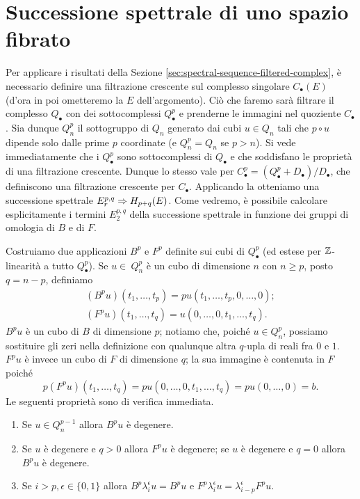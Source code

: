 \section{Successione spettrale di uno spazio fibrato}
Per applicare i risultati della Sezione \ref{sec:spectral-sequence-filtered-complex}, è necessario definire una filtrazione crescente sul complesso singolare $C_\bullet(E)$ (d'ora in poi ometteremo la $E$ dell'argomento). Ciò che faremo sarà filtrare il complesso $Q_\bullet$ con dei sottocomplessi $Q^p_\bullet$ e prenderne le immagini nel quoziente $C_\bullet$. Sia dunque $Q^p_n$ il sottogruppo di $Q_n$ generato dai cubi $u\in Q_n$ tali che $p\circ u$ dipende solo dalle prime $p$ coordinate (e $Q^p_n=Q_n$ se $p>n$). Si vede immediatamente che i $Q^p_\bullet$ sono sottocomplessi di $Q_\bullet$ e che soddisfano le proprietà di una filtrazione crescente. Dunque lo stesso vale per $C^p_\bullet=(Q^p_\bullet+D_\bullet)/D_\bullet$, che definiscono una filtrazione crescente per $C_\bullet$. Applicando la  otteniamo una successione spettrale $E^{p,q}_r\Rightarrow H_{p+q}(E)$. Come vedremo, è possibile calcolare esplicitamente i termini $E^{p,q}_2$ della successione spettrale in funzione dei gruppi di omologia di $B$ e di $F$.

Costruiamo due applicazioni $B^p$ e $F^p$ definite sui cubi di $Q^p_\bullet$ (ed estese per $\mathbb{Z}$-linearità a tutto $Q^p_\bullet$). Se $u\in\ Q^p_n$ è un cubo di dimensione $n$ con $n\ge p$, posto $q=n-p$, definiamo
\begin{align*}
(B^pu)(t_1,\ldots,t_p)=pu(t_1,\ldots,t_p,0,\ldots,0);\\
(F^pu)(t_1,\ldots,t_q)=u(0,\ldots,0,t_1,\ldots,t_q).
\end{align*}
$B^pu$ è un cubo di $B$ di dimensione $p$; notiamo che, poiché $u\in Q^p_n$, possiamo sostituire gli zeri nella definizione con qualunque altra $q$-upla di reali fra $0$ e $1$. $F^pu$ è invece un cubo di $F$ di dimensione $q$; la sua immagine è contenuta in $F$ poiché
$$
p(F^pu)(t_1,\ldots,t_q)=pu(0,\ldots,0,t_1,\ldots,t_q)=pu(0,\ldots,0)=b.
$$
Le seguenti proprietà sono di verifica immediata.
\begin{enumerate}
\item\label{spectral-sequence-of-fibration:pr1} Se $u\in Q^{p-1}_n$ allora $B^pu$ è degenere.
\item\label{spectral-sequence-of-fibration:pr2} Se $u$ è degenere e $q>0$ allora $F^pu$ è degenere; se $u$ è degenere e $q=0$ allora $B^pu$ è degenere.
\item\label{spectral-sequence-of-fibration:pr3} Se $i>p,\epsilon\in\{0,1\}$ allora $B^p\lambda^\epsilon_iu=B^pu$ e $F^p\lambda^\epsilon_iu=\lambda^\epsilon_{i-p}F^pu$.
\end{enumerate}

